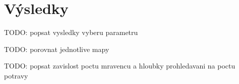 \chapter*{Výsledky}

TODO: popsat vysledky vyberu parametru

TODO: porovnat jednotlive mapy

TODO: popsat zavislost poctu mravencu a hloubky prohledavani na poctu potravy
